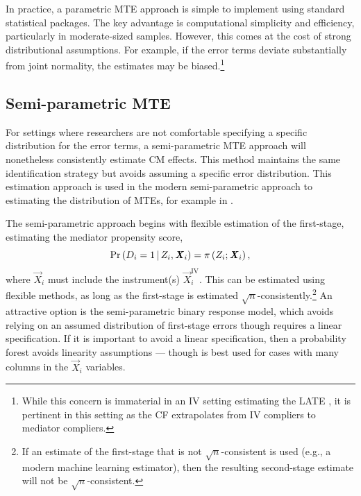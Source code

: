 In practice, a parametric MTE approach is simple to implement using standard statistical packages.
The key advantage is computational simplicity and efficiency, particularly in moderate-sized samples.
However, this comes at the cost of strong distributional assumptions.
For example, if the error terms deviate substantially from joint normality, the estimates may be biased.\footnote{
    While this concern is immaterial in an IV setting estimating the LATE \citep{kline2019heckits}, it is pertinent in this setting as the CF extrapolates from IV compliers to mediator compliers.
}

\subsection{Semi-parametric MTE}
\label{sec:semiparametric-mte}
For settings where researchers are not comfortable specifying a specific distribution for the error terms, a semi-parametric MTE approach will nonetheless consistently estimate CM effects.
This method maintains the same identification strategy but avoids assuming a specific error distribution.
This estimation approach is used in the modern semi-parametric approach to estimating the distribution of MTEs, for example in \cite{brinch2017beyond,heckman2007econometric}.

The semi-parametric approach begins with flexible estimation of the first-stage, estimating the mediator propensity score,
\[ \Pr\left( D_i = 1 \, \middle\vert \, Z_i, \boldsymbol{\mathit{X}}_i \right)
    = \pi\left(Z_i; \boldsymbol{\mathit{X}}_i \right), \]
where $\vec X_i$ must include the instrument(s) $\vec X_i^{\text{IV}}$.
This can be estimated using flexible methods, as long as the first-stage is estimated $\sqrt{n}$-consistently.\footnote{
    If an estimate of the first-stage that is not $\sqrt{n}$-consistent is used (e.g., a modern machine learning estimator), then the resulting second-stage estimate will not be $\sqrt{n}$-consistent.
}
An attractive option is the \cite{klein1993efficient} semi-parametric binary response model, which avoids relying on an assumed distribution of first-stage errors though requires a linear specification.
If it is important to avoid a linear specification, then a probability forest avoids linearity assumptions \citep{athey2019generalized} --- though is best used for cases with many columns in the $\vec X_i$ variables.

